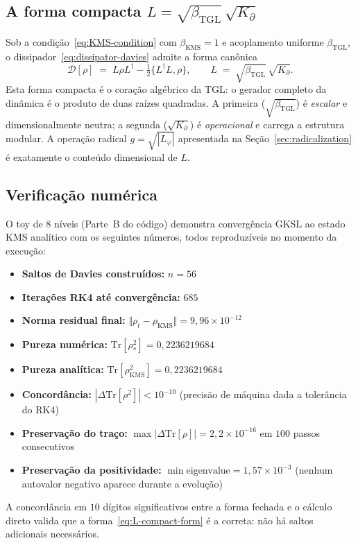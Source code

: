 \documentclass[12pt,a4paper]{article}
\newcommand{\betatgl}{\beta_{\text{TGL}}}
\newcommand{\Kpartial}{K_{\partial}}
\newcommand{\Lphi}{L_{\varphi}}
\newcommand{\TGL}{\textsc{TGL}}
\begin{document}
\subsection{A forma compacta $L = \sqrt{\betatgl}\,\sqrt{\Kpartial}$}
\label{sec:Lcompact}

Sob a condição~\eqref{eq:KMS-condition} com $\beta_{\text{KMS}} = 1$ e
acoplamento uniforme $\betatgl$, o dissipador~\eqref{eq:dissipator-davies}
admite a forma canônica
\begin{equation}
\mathcal{D}[\rho] \;=\;
L \rho L^{\dagger}
- \tfrac{1}{2}\{ L^{\dagger} L, \rho \},
\qquad
L \;=\; \sqrt{\betatgl} \, \sqrt{\Kpartial}.
\label{eq:L-compact-form}
\end{equation}
Esta forma compacta é o coração algébrico da \TGL{}: o gerador completo da
dinâmica é o produto de duas raízes quadradas.  A primeira ($\sqrt{\betatgl}$)
é \emph{escalar} e dimensionalmente neutra; a segunda ($\sqrt{\Kpartial}$)
é \emph{operacional} e carrega a estrutura modular.  A operação radical
$g = \sqrt{|\Lphi|}$ apresentada na Seção~\ref{sec:radicalization} é
exatamente o conteúdo dimensional de $L$.

\subsection{Verificação numérica}
\label{sec:gksl-numerical}

O toy de 8 níveis (Parte~B do código) demonstra convergência GKSL ao
estado KMS analítico com os seguintes números, todos
reproduzíveis no momento da execução:
\begin{itemize}[leftmargin=*]
\item \textbf{Saltos de Davies construídos:} $n = 56$
\item \textbf{Iterações RK4 até convergência:} $685$
\item \textbf{Norma residual final:} $\Vert \rho_t - \rho_{\text{KMS}} \Vert
= 9{,}96 \times 10^{-12}$
\item \textbf{Pureza numérica:} $\mathrm{Tr}[\rho_{*}^{2}] = 0{,}2236219684$
\item \textbf{Pureza analítica:} $\mathrm{Tr}[\rho_{\text{KMS}}^{2}] = 0{,}2236219684$
\item \textbf{Concordância:} $|\Delta \mathrm{Tr}[\rho^{2}]| < 10^{-10}$
(precisão de máquina dada a tolerância do RK4)
\item \textbf{Preservação do traço:} $\max |\Delta \mathrm{Tr}[\rho]| = 2{,}2 \times 10^{-16}$
em $100$ passos consecutivos
\item \textbf{Preservação da positividade:} $\min \text{eigenvalue} = 1{,}57 \times 10^{-3}$
(nenhum autovalor negativo aparece durante a evolução)
\end{itemize}
A concordância em $10$ dígitos significativos entre a forma fechada e o
cálculo direto valida que a forma~\eqref{eq:L-compact-form} é a correta:
não há saltos adicionais necessários.
\end{document}
